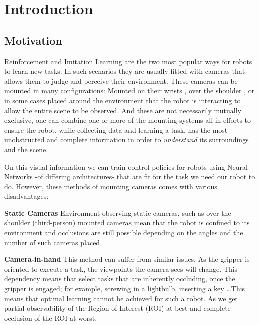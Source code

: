 \chapter{Introduction}
\section{Motivation}
    

  Reinforcement and Imitation Learning are the two most popular ways for robots to learn new tasks. In such scenarios they are usually fitted with cameras that allows them to judge and perceive their environment. These cameras can be mounted in many configurations: Mounted on their wrists \cite{chi2024UMIinthewild,openXEmbodimentRoboticLearning2024}, over the shoulder \cite{??}, or in some cases placed around the environment 
  \cite{?} that the robot is interacting to allow the entire scene to be observed. And these are not necessarily mutually exclusive, one can combine one or more of the mounting systems \cite{exploringActiveVision2024chuang} all in efforts to ensure the robot, while collecting data and learning a task, has the most unobstructed and complete information in order to \emph{understand} its surroundings and the scene.

  On this visual information we can train control policies for robots using Neural Networks \cite{spyros1995nnStateOfTheArt, Schmidhuber2015nn} -of differing architectures- that are fit for the task we need our robot to do. However, these methods of mounting cameras comes with various disadvantages:
  
  \textbf{Static Cameras} Environment observing static cameras, such as over-the-shoulder (third-person) mounted cameras \cite{??} mean that the robot is confined to its environment and occlusions are still possible depending on the angles and the number of such cameras placed.
    
  \textbf{Camera-in-hand} This method can suffer from similar issues. As the gripper is oriented to execute a task, the viewpoints the camera sees will change. This dependency means that select tasks that are inherently occluding, once the gripper is engaged; for example, screwing in a lightbulb, inserting a key \ldots This means that optimal learning cannot be achieved for such a robot. As we get partial observability of the Region of Interest (ROI) at best and complete occlusion of the ROI at worst.
    
